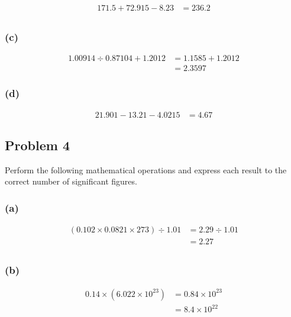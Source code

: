 \documentclass[11pt]{scrartcl}
\begin{document}
\begin{align*}
    171.5 + 72.915 - 8.23 &= \boxed{236.2} \\
\end{align*}

\subsubsection{(c)}

\begin{align*}
    1.00914 \div 0.87104 + 1.2012 &= 1.1585 + 1.2012\\
    &= \boxed{2.3597}
\end{align*}

\subsubsection{(d)}

\begin{align*}
    21.901 - 13.21 - 4.0215 &= \boxed{4.67}
\end{align*}

\newpage
\subsection{Problem 4}
 Perform the following mathematical operations and express each result to the correct number of significant
figures.

\subsubsection{(a)}

\begin{align*}
    \left (0.102 \times 0.0821 \times 273 \right) \div 1.01 &= 2.29 \div 1.01 \\
    &= \boxed{2.27} \\
\end{align*}

\subsubsection{(b)}

\begin{align*}
    0.14 \times \left (6.022 \times 10^{23} \right) &= 0.84 \times 10^{23} \\
    &= \boxed{8.4 \times 10^{22}} \\
\end{align*}
\end{document}
